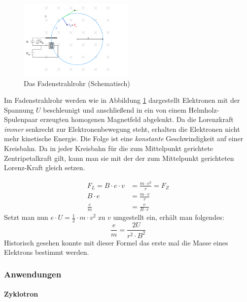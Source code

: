 \documentclass[a4paper]{article}
\begin{document}
				\begin{figure}[H]
					\centering
					\includegraphics[width=0.5\textwidth]{img/fadensrahlrohr.png}
					\caption{Das Fadenstrahlrohr (Schematisch)}
					\label{img:fadensrahlrohr}
				\end{figure}
				Im Fadenstrahlrohr werden wie in Abbildung \ref{img:fadensrahlrohr} dargestellt Elektronen mit der Spannung $U$ beschleunigt und anschließend in ein von einem Helmholz-Spulenpaar erzeugten homogenen Magnetfeld abgelenkt. Da die Lorenzkraft \textit{immer} senkrecht zur Elektronenbewegung steht, erhalten die Elektronen nicht mehr kinetische Energie. Die Folge ist eine \textit{konstante} Geschwindigkeit auf einer Kreisbahn. Da in jeder Kreisbahn für die zum Mittelpunkt gerichtete Zentripetalkraft gilt, kann man sie mit der der zum Mittelpunkt gerichteten Lorenz-Kraft gleich setzen.
				
				\begin{equation}
				\begin{aligned} 
				F_L=B\cdot e \cdot v &= \frac{m\cdot v^2}{r} = F_Z\\
				B\cdot e &= \frac{m\cdot v}{r}\\
				\frac{e}{m} &= \frac{v}{B\cdot r}
				\end{aligned}
				\end{equation}
				Setzt man nun $e\cdot U=\frac{1}{2}\cdot m\cdot v^2$ zu $v$ umgestellt ein, erhält man folgendes:
				\begin{equation}
					\frac{e}{m} = \frac{2U}{r^2\cdot B^2}
				\end{equation}
				Historisch gesehen konnte mit dieser Formel das erste mal die Masse eines Elektrons bestimmt werden.
				
		\subsubsection{Anwendungen}
			\paragraph{Zyklotron}
			
\end{document}
